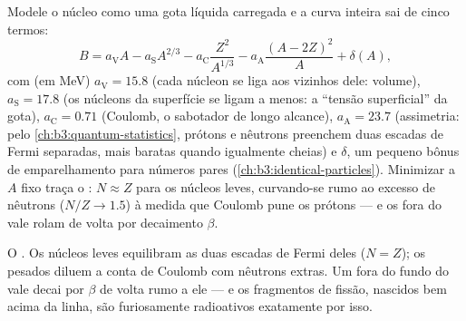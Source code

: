 \begin{proposition}\label{prop:b3:nuclear-physics:semf}
Modele o núcleo como uma gota líquida carregada e a curva inteira
sai de cinco termos:
\[
B = a_{\text{V}}A - a_{\text{S}}A^{2/3}
- a_{\text{C}}\frac{Z^2}{A^{1/3}}
- a_{\text{A}}\frac{(A - 2Z)^2}{A} + \delta(A) ,
\]
com (em \unit{MeV}) $a_{\text{V}} = 15.8$ (cada núcleon se liga aos
vizinhos dele: volume), $a_{\text{S}} = 17.8$ (os núcleons da superfície
se ligam a menos: a ``tensão superficial'' da gota), $a_{\text{C}} = 0.71$
(Coulomb, o sabotador de longo alcance), $a_{\text{A}} = 23.7$
(assimetria: pelo \cref{ch:b3:quantum-statistics}, prótons e
nêutrons preenchem duas escadas de Fermi separadas, mais baratas quando
igualmente cheias) e $\delta$, um pequeno bônus de emparelhamento para
números pares (\cref{ch:b3:identical-particles}). Minimizar a $A$ fixo
traça o \emph{}: $N \approx Z$ para os núcleos leves,
curvando-se rumo ao excesso de nêutrons ($N/Z \to 1.5$) à medida que
Coulomb pune os prótons --- e os  fora do vale rolam de volta
por decaimento $\beta$.
\end{proposition}
\admitted

\begin{omfigure}

{\small O . Os núcleos leves equilibram as duas
escadas de Fermi deles ($N = Z$); os pesados diluem a conta de Coulomb com
nêutrons extras. Um  fora do fundo do vale decai por $\beta$ de volta
rumo a ele --- e os fragmentos de fissão, nascidos bem acima da linha, são
furiosamente radioativos exatamente por isso.}
\end{omfigure}


